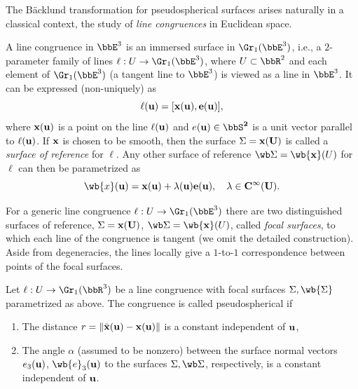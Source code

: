The B\"acklund transformation for pseudospherical surfaces arises naturally in a classical context, the study of \emph{line congruences} in Euclidean space.

\begin{defn}
    A line congruence in $\bbE^3$ is an immersed surface in $\Gr_1(\bbE^3)$, i.e., a $2$-parameter family of lines $\ell:U\to \Gr_1(\bbE^3)$, where $U\subset\bbR^2$ and each element of $\Gr_1(\bbE^3)$ (a tangent line to $\bbE^3$) is viewed as a line in $\bbE^3$. It can be expressed (non-uniquely) as 
    \[\ell(\bf{u})=[\bf{x}(\bf{u}),e(\bf{u})],\]
    where $\bf{x}(\bf{u})$ is a point on the line $\ell(\bf{u})$ and $e(\bf{u})\in\bbS^2$ is a unit vector parallel to $\ell(\bf{u})$. If $\bf{x}$ is chosen to be smooth, then the surface $\Sigma=\bf{x}(U)$ is called a \emph{surface of reference} for $\ell$. Any other surface of reference $\wb\Sigma=\wb{\bf{x}}(U)$ for $\ell$ can then be parametrized as 
    \[\wb{x}(\bf{u})=\bf{x}(\bf{u})+\lambda(\bf{u})e(\bf{u}),\quad \lambda\in C^\infty(U).\]

    For a generic line congruence $\ell:U\to \Gr_1(\bbE^3)$ there are two distinguished surfaces of reference, $\Sigma=\bf{x}(U)$, $\wb\Sigma=\wb{\bf{x}}(U)$, called \emph{focal surfaces}, to which each line of the congruence is tangent (we omit the detailed construction). Aside from degeneracies, the lines locally give a $1$-to-$1$ correspondence between points of the focal surfaces.
\end{defn}


\begin{defn}
    Let $\ell:U\to \Gr_1(\bbR^3)$ be a line congruence with focal surfaces $\Sigma,\wb{\Sigma}$ parametrized as above. The congruence is called pseudospherical if 
    \begin{enumerate}[label=(\alph*)]
        \item The distance $r=\lVert\bar{\bf x}(\bf{u})-\bf{x}(\bf{u})\rVert$ is a constant independent of $\bf{u}$,
        \item The angle $\alpha$ (assumed to be nonzero) between the surface normal vectors $e_3(\bf{u})$, $\wb{e}_3(\bf{u})$ to the surfaces $\Sigma,\wb\Sigma$, respectively, is a constant independent of $\bf{u}$.
    \end{enumerate}
\end{defn}

